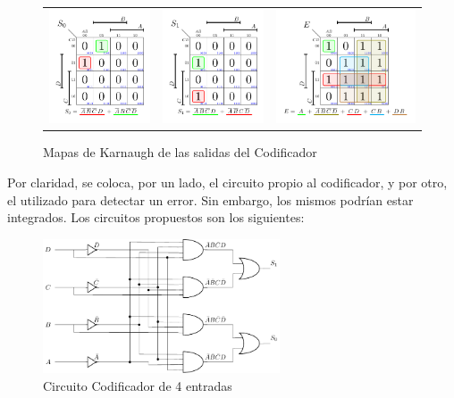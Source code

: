\begin{figure}[H]
   \centering
\begin{tabular}{ccc}
	\includegraphics[width=4cm,trim={0.25cm 0.5cm  0.25cm 0.25cm},clip]{Ejercicio_3/Karnaugh/ENCODER/Salida_S_0.pdf}& \hspace{3ex} 
	\includegraphics[width=4cm,trim={0.25cm 0.5cm  0.25cm 0.25cm},clip]{Ejercicio_3/Karnaugh/ENCODER/Salida_S_1.pdf}&
		\includegraphics[width=5.5cm,trim={0.25cm 0.5cm  0.25cm 0.25cm},clip]{Ejercicio_3/Karnaugh/ENCODER/Salida_E.pdf}\\
	\end{tabular}
    \caption{Mapas de Karnaugh de las salidas del Codificador}
    \label{fig:Karnaughs_encoder} %
\end{figure}
Por claridad, se coloca, por un lado, el circuito propio al codificador, y por otro, el utilizado para detectar un error. Sin embargo, los mismos podrían estar integrados. Los circuitos propuestos son los siguientes:

\begin{figure}[H]
\centering
\includegraphics[width=7cm,height=4cm]{Ejercicio_3/Circuitos/Circuito_ENCODER.pdf}
\caption{Circuito Codificador de 4 entradas}
\label{fig:Circuito_ENCODER}
\end{figure}

